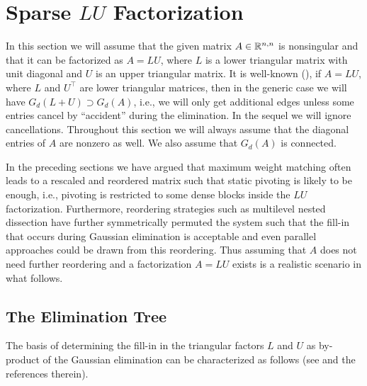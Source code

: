 \section{Sparse $LU$ Factorization}
\label{sec:lu}
In this section we will assume that the given matrix $A\in\mathbb{R}^{n,n}$ is nonsingular and that it can be factorized as $A=LU$, where $L$ is a lower triangular matrix with unit diagonal and
$U$ is an upper triangular matrix. 
It is well-known (\cite{GeoL81}), if $A=LU$, where $L$ and $U^\top$ are lower
triangular matrices, then in the generic case we will have
$G_d(L+U)\supset G_d(A)$, i.e., we will only get additional edges unless some
entries cancel by ``accident'' during the elimination. In the sequel
we will ignore cancellations. Throughout this section we will always assume
that the diagonal entries of $A$ are nonzero as well. We also assume that $G_d(A)$
is connected.


In the preceding sections we have argued that
maximum weight matching often leads to a rescaled and reordered matrix such that
static pivoting is likely to be enough, i.e., 
pivoting is restricted to some dense blocks inside the $LU$ factorization.
Furthermore, reordering strategies such as multilevel nested dissection have 
further symmetrically permuted the system such that the fill-in that occurs
during Gaussian elimination is acceptable and even parallel approaches could
be drawn from this reordering. Thus assuming that $A$ does not need further
reordering and a factorization $A=LU$ exists 
is a realistic scenario in what follows.






\subsection{The Elimination Tree}
\label{subsec:etree}
The basis of determining the fill-in in the triangular factors 
$L$ and $U$ as by-product of the Gaussian elimination can be characterized
as follows (see \cite{Gil94} and the references therein). 

